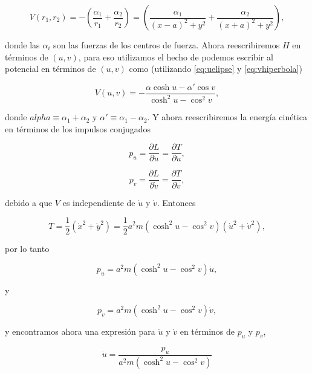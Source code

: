 \documentclass[a4paper,10pt]{article}
\numberwithin{equation}{section}
\begin{document}
\begin{equation}
 V(r_1,r_2) = - \left(\frac{\alpha_1}{r_1} + \frac{\alpha_2}{r_2} \right)
  = \left(\frac{\alpha_1}{(x - a)^2 + y^2} + \frac{\alpha_2}{(x + a)^2 + y^2}\right),
\end{equation}

donde las $\alpha_i$ son las fuerzas de los centros de fuerza. Ahora reescribiremos 
$H$ en términos de $(u,v)$, para eso utilizamos el hecho de podemos escribir al potencial 
en términos de $(u,v)$ como (utilizando \eqref{eq:uelipse} y \eqref{eq:vhiperbola})

\begin{equation}
 V(u,v) = - \frac{\alpha \cosh{u} - \alpha'\cos{v}}{\cosh^2{u}- \cos^2{v}},
\end{equation}

donde $alpha \equiv \alpha_1 + \alpha_2$ y $\alpha' \equiv \alpha_1 - \alpha_2$. Y ahora 
reescribiremos la energía cinética en términos de los impulsos conjugados 

\begin{equation}
 p_u = \frac{\partial L}{\partial \dot{u}} = \frac{\partial T}{\partial \dot{u}},
\end{equation}

\begin{equation}
 p_v = \frac{\partial L}{\partial \dot{v}} = \frac{\partial T}{\partial \dot{v}},
\end{equation}

debido a que $V$ es independiente de $\dot{u}$ y $\dot{v}$. Entonces 

\begin{equation}
 T = \frac{1}{2} (\dot{x}^2 + \dot{y}^2) = \frac{1}{2}a^2m(\cosh^2{u} - \cos^2{v})
 (\dot{u}^2+\dot{v}^2),
\end{equation}

por lo tanto

\begin{equation}
 p_u = a^2m(\cosh^2{u} - \cos^2{v})\dot{u},
\end{equation}

y 

\begin{equation}
 p_v = a^2m(\cosh^2{u} - \cos^2{v})\dot{v},
\end{equation}

y encontramos ahora una expresión para $\dot{u}$ y $\dot{v}$ en términos de 
$p_u$ y $p_v$, 

\begin{equation}
 \dot{u} = \frac{p_u}{a^2m(\cosh^2{u} - \cos^2{v})}
\end{equation}
\end{document}

